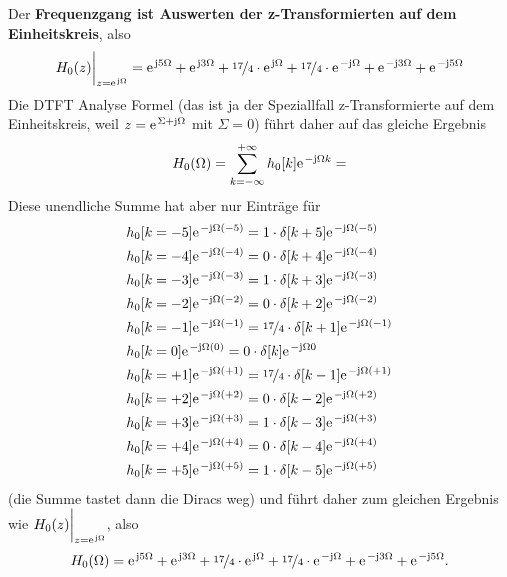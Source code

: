 Der \textbf{Frequenzgang ist Auswerten der z-Transformierten auf dem Einheitskreis}, also
\begin{align}
H_0(z)\bigg|_{z=\e^{\im\Omega}}
=
\e^{\im 5 \Omega} + \e^{\im 3 \Omega} + \nicefrac{17}{4}\cdot \e^{\im \Omega}
 + \nicefrac{17}{4}\cdot \e^{-\im\Omega} + \e^{-\im 3 \Omega} + \e^{-\im 5 \Omega}
\end{align}
%
Die DTFT Analyse Formel (das ist ja der Speziallfall
z-Transformierte auf dem Einheitskreis, weil $z=\e^{\Sigma+\im\Omega}$ mit
$\Sigma=0$) führt daher auf das gleiche Ergebnis
\begin{align}
H_0(\Omega) = \sum_{k=-\infty}^{+\infty} h_0[k] \e^{-\im\Omega k}=
\end{align}
Diese unendliche Summe hat aber nur Einträge für
\begin{align}
&h_0[k=-5] \e^{-\im\Omega (-5)} =  1\cdot\delta[k+5] \e^{-\im\Omega (-5)}\nonumber\\
&h_0[k=-4] \e^{-\im\Omega (-4)} =  0\cdot\delta[k+4] \e^{-\im\Omega (-4)}\nonumber\\
&h_0[k=-3] \e^{-\im\Omega (-3)} =  1\cdot\delta[k+3] \e^{-\im\Omega (-3)}\nonumber\\
&h_0[k=-2] \e^{-\im\Omega (-2)} =  0\cdot\delta[k+2] \e^{-\im\Omega (-2)}\nonumber\\
&h_0[k=-1] \e^{-\im\Omega (-1)} =  \nicefrac{17}{4}\cdot\delta[k+1] \e^{-\im\Omega (-1)}\nonumber\\
&h_0[k=0] \e^{-\im\Omega (0)} =  0\cdot\delta[k] \e^{-\im\Omega 0}\nonumber\\
&h_0[k=+1] \e^{-\im\Omega (+1)} =  \nicefrac{17}{4}\cdot\delta[k-1] \e^{-\im\Omega (+1)}\nonumber\\
&h_0[k=+2] \e^{-\im\Omega (+2)} =  0\cdot\delta[k-2] \e^{-\im\Omega (+2)}\nonumber\\
&h_0[k=+3] \e^{-\im\Omega (+3)} =  1\cdot\delta[k-3] \e^{-\im\Omega (+3)}\nonumber\\
&h_0[k=+4] \e^{-\im\Omega (+4)} =  0\cdot\delta[k-4] \e^{-\im\Omega (+4)}\nonumber\\
&h_0[k=+5] \e^{-\im\Omega (+5)} =  1\cdot\delta[k-5] \e^{-\im\Omega (+5)}
\end{align}
(die Summe tastet dann die Diracs weg)
und führt daher zum gleichen Ergebnis wie $H_0(z)\bigg|_{z=\e^{\im\Omega}}$, also
\begin{align}
H_0(\Omega)
=
\e^{\im 5 \Omega} + \e^{\im 3 \Omega} + \nicefrac{17}{4}\cdot \e^{\im \Omega}
 + \nicefrac{17}{4}\cdot \e^{-\im\Omega} + \e^{-\im 3 \Omega} + \e^{-\im 5 \Omega}.
\end{align}
